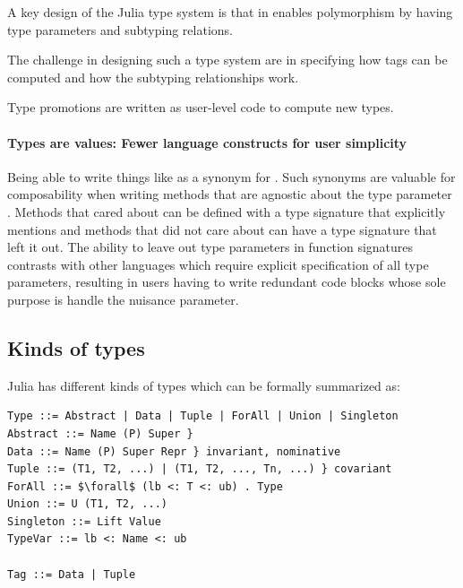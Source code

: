 \documentclass[pldi]{sigplanconf-pldi15}
\begin{document}
A key design of the Julia type system is that in enables polymorphism by having type parameters and subtyping relations.

The challenge in designing such a type system are in specifying how
tags can be computed and how the subtyping relationships work.

Type promotions are written as user-level code to compute new types.

\paragraph{Types are values: Fewer language constructs for user simplicity}
Being able to write things like  as a synonym
for .  Such synonyms are valuable for composability when
writing methods that are agnostic about the type parameter .  Methods
that cared about  can be defined with a type signature that explicitly
mentions  and methods that did not care about  can have a type
signature that left it out.  The ability to leave out type parameters in
function signatures contrasts with other languages  which
require explicit specification of all type parameters, resulting in users
having to write redundant code blocks whose sole purpose is handle the nuisance
parameter.


\subsection{Kinds of types}

Julia has different kinds of types which can be formally summarized as:

\begin{lstlisting}
Type ::= Abstract | Data | Tuple | ForAll | Union | Singleton
Abstract ::= Name (P) Super }
Data ::= Name (P) Super Repr } invariant, nominative
Tuple ::= (T1, T2, ...) | (T1, T2, ..., Tn, ...) } covariant
ForAll ::= $\forall$ (lb <: T <: ub) . Type
Union ::= U (T1, T2, ...)
Singleton ::= Lift Value
TypeVar ::= lb <: Name <: ub

Tag ::= Data | Tuple
\end{lstlisting}
\end{document}

